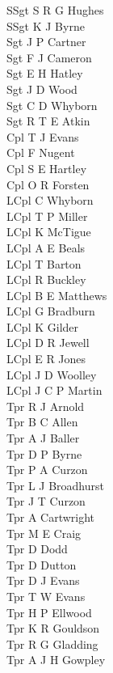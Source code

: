 \begin{multicols}{4}
  \scriptsize
  \noindent
  SSgt S R G Hughes \\
  SSgt K J Byrne \\
  Sgt J P Cartner \\
  Sgt F J Cameron \\
  Sgt E H Hatley \\
  Sgt J D Wood \\
  Sgt C D Whyborn \\
  Sgt R T E Atkin \\
  Cpl T J Evans \\
  Cpl F Nugent \\
  Cpl S E Hartley \\
  Cpl O R Forsten \\
  LCpl C Whyborn \\
  LCpl T P Miller \\
  LCpl K McTigue \\
  LCpl A E Beals \\
  LCpl T Barton \\
  LCpl R Buckley \\
  LCpl B E Matthews \\
  LCpl G Bradburn \\
  LCpl K Gilder \\
  LCpl D R Jewell \\
  LCpl E R Jones \\
  LCpl J D Woolley \\
  LCpl J C P Martin \\
  Tpr R J Arnold \\
  Tpr B C Allen \\
  Tpr A J Baller \\
  Tpr D P Byrne \\
  Tpr P A Curzon \\
  Tpr L J Broadhurst \\
  Tpr J T Curzon \\
  Tpr A Cartwright \\
  Tpr M E Craig \\
  Tpr D Dodd \\
  Tpr D Dutton \\
  Tpr D J Evans \\
  Tpr T W Evans \\
  Tpr H P Ellwood \\
  Tpr K R Gouldson \\
  Tpr R G Gladding \\
  Tpr A J H Gowpley \\

\end{multicols}
